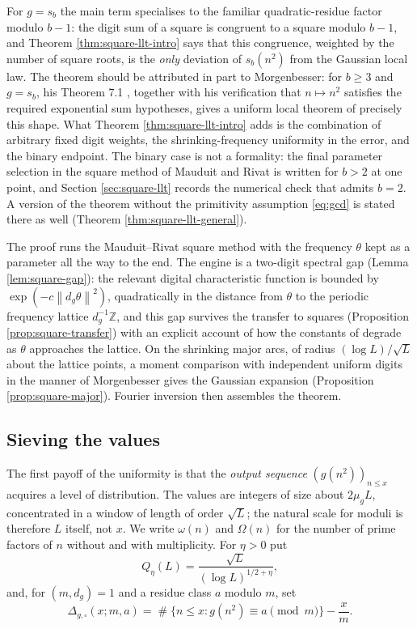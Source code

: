 \documentclass[11pt,reqno]{amsart}
\theoremstyle{plain}
\theoremstyle{definition}
\newcommand{\Z}{\mathbb{Z}}
\newcommand{\1}{\mathbf 1}
\newcommand{\norm}[1]{\left\lVert #1\right\rVert}
\DeclareMathOperator{\Card}{\#}
\begin{document}
For $g=s_b$ the main term specialises to the familiar quadratic-residue factor modulo $b-1$: the digit sum of a square is congruent to a square modulo $b-1$, and Theorem \ref{thm:square-llt-intro} says that this congruence, weighted by the number of square roots, is the \emph{only} deviation of $s_b(n^2)$ from the Gaussian local law. The theorem should be attributed in part to Morgenbesser: for $b\ge3$ and $g=s_b$, his Theorem 7.1 \cite{morgenbesser}, together with his verification that $n\mapsto n^2$ satisfies the required exponential sum hypotheses, gives a uniform local theorem of precisely this shape. What Theorem \ref{thm:square-llt-intro} adds is the combination of arbitrary fixed digit weights, the shrinking-frequency uniformity in the error, and the binary endpoint. The binary case is not a formality: the final parameter selection in the square method of Mauduit and Rivat \cite{mauduitrivat-squares} is written for $b>2$ at one point, and Section \ref{sec:square-llt} records the numerical check that admits $b=2$. A version of the theorem without the primitivity assumption \eqref{eq:gcd} is stated there as well (Theorem \ref{thm:square-llt-general}).

The proof runs the Mauduit--Rivat square method with the frequency $\theta$ kept as a parameter all the way to the end. The engine is a two-digit spectral gap (Lemma \ref{lem:square-gap}): the relevant digital characteristic function is bounded by $\exp(-c\norm{d_g\theta}^2)$, quadratically in the distance from $\theta$ to the periodic frequency lattice $d_g^{-1}\Z$, and this gap survives the transfer to squares (Proposition \ref{prop:square-transfer}) with an explicit account of how the constants of \cite{mauduitrivat-squares} degrade as $\theta$ approaches the lattice. On the shrinking major arcs, of radius $(\log L)/\sqrt L$ about the lattice points, a moment comparison with independent uniform digits in the manner of Morgenbesser gives the Gaussian expansion (Proposition \ref{prop:square-major}). Fourier inversion then assembles the theorem.

\subsection{Sieving the values}
The first payoff of the uniformity is that the \emph{output sequence} $(g(n^2))_{n\le x}$ acquires a level of distribution. The values are integers of size about $2\mu_gL$, concentrated in a window of length of order $\sqrt L$; the natural scale for moduli is therefore $L$ itself, not $x$. We write $\omega(n)$ and $\Omega(n)$ for the number of prime factors of $n$ without and with multiplicity. For $\eta>0$ put
\begin{equation}\label{eq:Qeta-intro}
 Q_\eta(L)=\frac{\sqrt L}{(\log L)^{1/2+\eta}},
\end{equation}
and, for $(m,d_g)=1$ and a residue class $a$ modulo $m$, set
\[
 \Delta_{g,\square}(x;m,a)=
 \Card\{n\le x:g(n^2)\equiv a\pmod m\}-\frac{x}{m}.
\]
\end{document}
